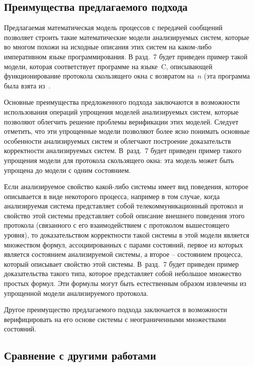 \begin{multicols}{2}
\subsection{Преимущества предлагаемого подхода}

Предлагаемая математическая модель
процессов с передачей сообщений позволяет
строить такие математические модели анализируемых систем, которые во многом
похожи на исходные описания этих систем на
ка\-ком-ли\-бо императивном языке программирования.
В разд.~7  будет приведен
пример такой модели, которая соответствует программе на
языке~C, описывающей функционирование протокола скользящего окна с возвратом на~$n$
(эта программа была взята из~\cite[п.~3.4.2]{12-mir}.

Основные преимущества предложенного подхода
заключаются в возможности использования операций упрощения моделей анализируемых
сис\-тем, которые позволяют облегчить решение
проб\-ле\-мы верификации этих моделей.
Следует отметить, что эти упрощенные модели позволяют более ясно понимать основные особенности
анализиру\-емых систем
и облегчают построение  доказательств корректности ана\-ли\-зи\-ру\-емых сис\-тем.
В~разд.~7  будет приведен пример такого
упрощения модели для протокола скользящего окна: эта модель может быть упрощена
до модели с одним состоянием.

Если анализируемое свойство ка\-кой-ли\-бо сис\-те\-мы
имеет вид поведения, которое описывается в виде некоторого процесса, например в том случае, когда
анализируемая система представляет собой телекоммуникационный протокол и
свойство этой системы представляет собой
описание внешнего поведения этого протокола
(связанного с его взаимодействием с протоколом вышестоящего уровня),
то доказательством корректности такой системы в этой модели является множеством формул,
ассоциированных с парами состояний, первое из которых является состоянием анализируемой
системы, а второе -- состоянием процесса, который описывает свойство этой системы.
В~разд.~7 будет приведен пример доказательства
такого типа, которое представляет собой небольшое множество простых формул.
Эти формулы могут быть естественным образом
извлечены из упрощенной модели анализируемого протокола.

Другое преимущество предлагаемого подхода заключается в возможности верифицировать
на его основе системы с неограниченными множествами состояний.

\subsection{Сравнение с другими работами}


\end{multicols}
